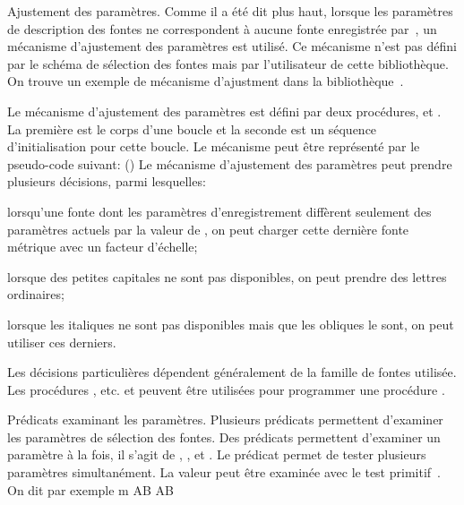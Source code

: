 \formalpar Ajustement des paramètres.
Comme il a été dit plus haut, lorsque les paramètres de description
des fontes ne correspondent à aucune fonte enregistrée
par~, un mécanisme d'ajustement des paramètres est
utilisé. Ce mécanisme n'est pas défini par le schéma de sélection des
fontes mais par l'utilisateur de cette bibliothèque. On trouve un
exemple de mécanisme d'ajustment dans la bibliothèque~.

Le mécanisme d'ajustement des paramètres est défini par deux
procédures,  et . La
première est le corps d'une boucle et la seconde est un séquence
d'initialisation pour cette boucle. Le mécanisme peut être représenté
par le pseudo-code suivant:
\beginlines
{}
 \sy(\sy) 
\quad{}
\endlines
Le mécanisme d'ajustement des paramètres peut prendre plusieurs
décisions, parmi lesquelles:

\beginroster

\item lorsqu'une fonte dont les paramètres d'enregistrement
diffèrent seulement des paramètres actuels par la valeur de
, on peut charger cette dernière fonte métrique avec un
facteur d'échelle;

\item lorsque des petites capitales ne sont pas disponibles, on peut
prendre des lettres ordinaires;

\item  lorsque les italiques ne sont pas disponibles mais que les
obliques le sont, on peut utiliser ces derniers.

\endroster
Les décisions particulières dépendent généralement de la famille de
fontes utilisée. Les procédures , etc. et
 peuvent être utilisées pour programmer une procédure
.


\formalpar Prédicats examinant les paramètres.
Plusieurs prédicats permettent d'examiner les paramètres de sélection
des fontes. Des prédicats permettent d'examiner un paramètre à la
fois, il s'agit de , ,
 et . Le prédicat
 permet de tester plusieurs paramètres simultanément.
La valeur  peut être examinée avec le test
primitif~.  On dit par exemple
\beginverbatim
\testfontwidth m%
\iffontwidth
  \ifx\relax\undefined A\else B\fi
\else
  \ifx\relax\undefined A\else B\fi
\fi
\endverbatim

